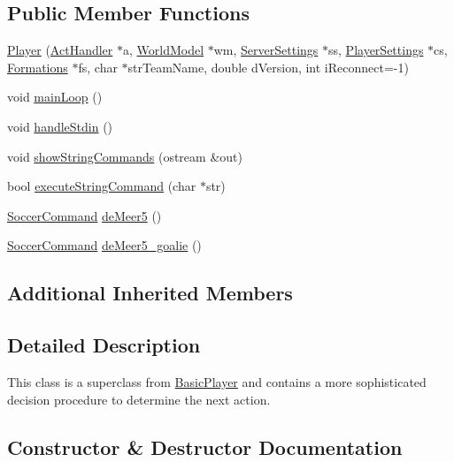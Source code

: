 \subsection*{Public Member Functions}
\begin{DoxyCompactItemize}
\item 
\hyperlink{classPlayer_a4c153178edd52d55138de2b29bfe8b4e}{Player} (\hyperlink{classActHandler}{Act\+Handler} $\ast$a, \hyperlink{classWorldModel}{World\+Model} $\ast$wm, \hyperlink{classServerSettings}{Server\+Settings} $\ast$ss, \hyperlink{classPlayerSettings}{Player\+Settings} $\ast$cs, \hyperlink{classFormations}{Formations} $\ast$fs, char $\ast$str\+Team\+Name, double d\+Version, int i\+Reconnect=-\/1)
\item 
void \hyperlink{classPlayer_a9131e8dceb75d7e29fd25873826f0854}{main\+Loop} ()
\item 
void \hyperlink{classPlayer_a8062df3ae047a16b10412a60868aa0b3}{handle\+Stdin} ()
\item 
void \hyperlink{classPlayer_ac570eafbfa3a9cea6643cca5e29ad886}{show\+String\+Commands} (ostream \&out)
\item 
bool \hyperlink{classPlayer_a6a2b774c924eb6337d755116b6688a64}{execute\+String\+Command} (char $\ast$str)
\item 
\hyperlink{classSoccerCommand}{Soccer\+Command} \hyperlink{classPlayer_a07a5fde1959439ebb1fec9d3b2cb8d77}{de\+Meer5} ()
\item 
\hyperlink{classSoccerCommand}{Soccer\+Command} \hyperlink{classPlayer_a3ac63e752e972c54e4333e832f61737e}{de\+Meer5\+\_\+goalie} ()
\end{DoxyCompactItemize}
\subsection*{Additional Inherited Members}


\subsection{Detailed Description}
This class is a superclass from \hyperlink{classBasicPlayer}{Basic\+Player} and contains a more sophisticated decision procedure to determine the next action. 

\subsection{Constructor \& Destructor Documentation}
